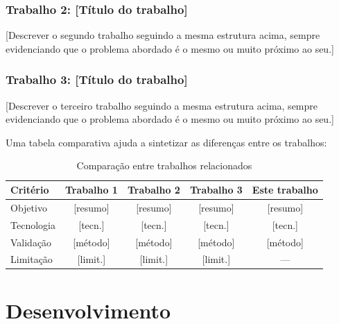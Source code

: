 \documentclass[
    12pt,                %
    openright,           %
    oneside,             %
    a4paper,             %
    english,             %
    brazil               %
]{abntex2}
\begin{document}
\subsection{Trabalho 2: [Título do trabalho]}

[Descrever o segundo trabalho seguindo a mesma estrutura acima, sempre evidenciando que o problema abordado é o mesmo ou muito próximo ao seu.]

\subsection{Trabalho 3: [Título do trabalho]}

[Descrever o terceiro trabalho seguindo a mesma estrutura acima, sempre evidenciando que o problema abordado é o mesmo ou muito próximo ao seu.]

\vspace{0.5cm}

Uma tabela comparativa ajuda a sintetizar as diferenças entre os trabalhos:

\begin{table}[htb]
    \centering
    \caption{Comparação entre trabalhos relacionados}
    \label{tab:trabalhos_relacionados}
    \begin{tabular}{l|c|c|c|c}
        \toprule
        \textbf{Critério} & \textbf{Trabalho 1} & \textbf{Trabalho 2} & \textbf{Trabalho 3} & \textbf{Este trabalho} \\
        \midrule
        Objetivo           & [resumo]   & [resumo]   & [resumo]   & [resumo] \\
        \midrule
        Tecnologia         & [tecn.]    & [tecn.]    & [tecn.]    & [tecn.] \\
        \midrule
        Validação          & [método]   & [método]   & [método]   & [método] \\
        \midrule
        Limitação          & [limit.]   & [limit.]   & [limit.]   & --- \\
        \bottomrule
    \end{tabular}
\end{table}

\chapter{Desenvolvimento}
\label{cap:desenvolvimento}
\end{document}
